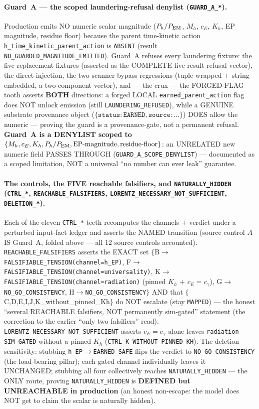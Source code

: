 \paragraph{Guard~A --- the scoped laundering-refusal denylist (\texttt{GUARD\_A\_*}).}
Production emits NO numeric scalar magnitude (\(P_h/P_{\rm EM}\), \(M_h\), \(c_E\),
\(K_h\), EP magnitude, residue floor) because the parent time-kinetic action
\texttt{h\_time\_kinetic\_parent\_action} is \texttt{ABSENT} (result
\texttt{NO\_GUARDED\_MAGNITUDE\_EMITTED}). Guard~A refuses every laundering
fixture: the five replacement fixtures (asserted as the COMPLETE five-result
refusal vector), the direct injection, the two scanner-bypass regressions
(tuple-wrapped \(+\) string-embedded, a two-component vector), and --- the crux ---
the FORGED-FLAG tooth asserts \textbf{BOTH} directions: a forged LOCAL
\texttt{earned\_parent\_action} flag does NOT unlock emission (still
\texttt{LAUNDERING\_REFUSED}), while a GENUINE substrate provenance object
(\(\{\texttt{status}{:}\texttt{EARNED},\texttt{source}{:}\ldots\}\)) DOES allow the
numeric --- proving the guard is a provenance-gate, not a permanent refusal.
\textbf{Guard~A is a DENYLIST scoped to
\(\{M_h,c_E,K_h,P_h/P_{\rm EM},\text{EP-magnitude},\text{residue-floor}\}\)}: an
UNRELATED new numeric field PASSES THROUGH (\texttt{GUARD\_A\_SCOPE\_DENYLIST})
--- documented as a scoped limitation, NOT a universal ``no number can ever leak''
guarantee.

\paragraph{The controls, the FIVE reachable falsifiers, and \texttt{NATURALLY\_HIDDEN} (\texttt{CTRL\_*}, \texttt{REACHABLE\_FALSIFIERS}, \texttt{LORENTZ\_NECESSARY\_NOT\_SUFFICIENT}, \texttt{DELETION\_*}).}
Each of the eleven \texttt{CTRL\_*} teeth recomputes the channels \(+\) verdict
under a perturbed input-fact ledger and asserts the NAMED transition (source
control \(A\) IS Guard~A, folded above --- all 12 source controls accounted).
\texttt{REACHABLE\_FALSIFIERS} asserts the EXACT set
\(\{\)B\(\to\)\texttt{FALSIFIABLE\_TENSION(channel=h\_EP)},
F\(\to\)\texttt{FALSIFIABLE\_TENSION(channel=universality)},
K\(\to\)\texttt{FALSIFIABLE\_TENSION(channel=radiation)}
(pinned \(K_h\) \(+\) \(c_E{=}c_\gamma\)),
G\(\to\)\texttt{NO\_GO\_CONSISTENCY},
H\(\to\)\texttt{NO\_GO\_CONSISTENCY}\(\}\) AND that
\(\{\)C,D,E,I,J,K\_without\_pinned\_Kh\(\}\) do NOT escalate (stay \texttt{MAPPED}) --- the
honest ``several REACHABLE falsifiers, NOT permanently sim-gated'' statement (the
correction to the earlier ``only two falsifiers'' read).
\texttt{LORENTZ\_NECESSARY\_NOT\_SUFFICIENT} asserts \(c_E{=}c_\gamma\) alone
leaves \texttt{radiation} \texttt{SIM\_GATED} without a pinned \(K_h\)
(\texttt{CTRL\_K\_WITHOUT\_PINNED\_KH}). The deletion-sensitivity: stubbing
\texttt{h\_EP}\(\to\)\texttt{EARNED\_SAFE} flips the verdict to
\texttt{NO\_GO\_CONSISTENCY} (the load-bearing pillar); each gated channel
individually leaves it UNCHANGED; stubbing all four collectively reaches
\texttt{NATURALLY\_HIDDEN} --- the ONLY route, proving \texttt{NATURALLY\_HIDDEN}
is \textbf{DEFINED but UNREACHABLE in production} (an honest non-escape: the model
does NOT get to claim the scalar is naturally hidden).

